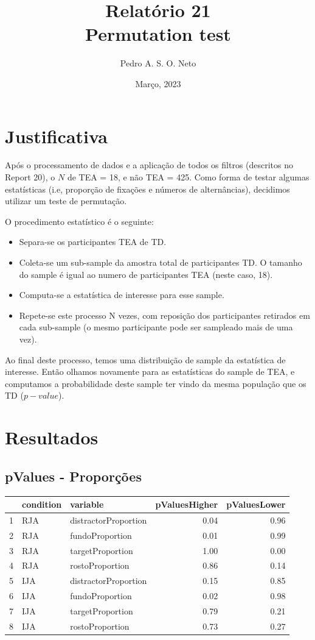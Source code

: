 \documentclass{article}
\title{Relatório 21 \\ Permutation test}
\author{Pedro A. S. O. Neto}
\date{Março, 2023}
\begin{document}
\maketitle

\section{Justificativa}

Após o processamento de dados e a aplicação de todos os filtros (descritos no Report 20), o $N$ de TEA = 18, e não TEA = 425.
Como forma de testar algumas estatísticas (i.e, proporção de fixações e números de alternâncias), decidimos utilizar um teste de permutação.

O procedimento estatístico é o seguinte:
\begin{itemize}
  \item Separa-se os participantes TEA de TD.
  \item Coleta-se um sub-sample da amostra total de participantes TD. O tamanho do sample é igual ao numero de participantes TEA (neste caso, 18).
  \item Computa-se a estatística de interesse para esse sample.
  \item Repete-se este processo N vezes, com reposição dos participantes retirados em cada sub-sample (o mesmo participante pode ser sampleado mais de uma vez).
\end{itemize}

Ao final deste processo, temos uma distribuição de sample da estatística de interesse. Então olhamos novamente para as estatísticas do sample de TEA, e computamos a probabilidade deste sample ter vindo da mesma população que os TD ($p-value$).

\section{Resultados}

\subsection{pValues - Proporções}

  \begin{table}[ht]
  \centering
  \begin{tabular}{rllrr}
    \hline
   & condition & variable & pValuesHigher & pValuesLower \\ 
    \hline
  1 & RJA & distractorProportion & 0.04 & 0.96 \\ 
    2 & RJA & fundoProportion & 0.01 & 0.99 \\ 
    3 & RJA & targetProportion & 1.00 & 0.00 \\ 
    4 & RJA & rostoProportion & 0.86 & 0.14 \\ 
    5 & IJA & distractorProportion & 0.15 & 0.85 \\ 
    6 & IJA & fundoProportion & 0.02 & 0.98 \\ 
    7 & IJA & targetProportion & 0.79 & 0.21 \\ 
    8 & IJA & rostoProportion & 0.73 & 0.27 \\ 
     \hline
  \end{tabular}
  \end{table}
\end{document}
